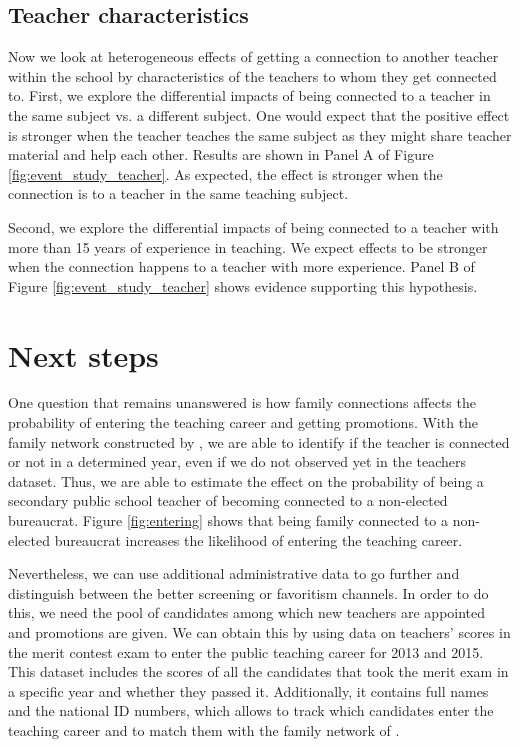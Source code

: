 \documentclass[12pt,runningheads]{article}
\begin{document}
\subsection{Teacher characteristics} 
 
Now we look at heterogeneous effects of getting a connection to another teacher within the school by characteristics of the teachers to whom they get connected to. First, we explore the differential impacts of being connected to a teacher in the same subject vs. a different subject. One would expect that the positive effect is stronger when the teacher teaches the same subject as they might share teacher material and help each other. Results are shown in Panel A of Figure \ref{fig:event_study_teacher}. As expected, the effect is stronger when the connection is to a teacher in the same teaching subject.

Second, we explore the differential impacts of being connected to a teacher with more than 15 years of experience in teaching. We expect effects to be stronger when the connection happens to a teacher with more experience. Panel B of Figure \ref{fig:event_study_teacher} shows evidence supporting this hypothesis.

\section{Next steps}
One question that remains unanswered is how family connections affects the probability of entering the teaching career and getting promotions. With the family network constructed by \cite{Riano2021}, we are able to identify if the teacher is connected or not in a determined year, even if we do not observed yet in the teachers dataset. Thus, we are able to estimate the effect on the probability of being a secondary public school teacher of becoming connected to a non-elected bureaucrat. Figure \ref{fig:entering} shows that being family connected to a non-elected bureaucrat increases the likelihood of entering the teaching career. 

Nevertheless, we can use additional administrative data to go further and distinguish between the better screening or favoritism channels. In order to do this, we need the pool of candidates among which new teachers are appointed and promotions are given. We can obtain this by using data on teachers’ scores in the merit contest exam to enter the public teaching career for 2013 and 2015. This dataset includes the scores of all the candidates that took the merit exam in a specific year and whether they passed it. Additionally, it contains full names and the national ID numbers, which allows to track which candidates enter the teaching career and to match them with the family network of \cite{Riano2021}. 
\end{document}
